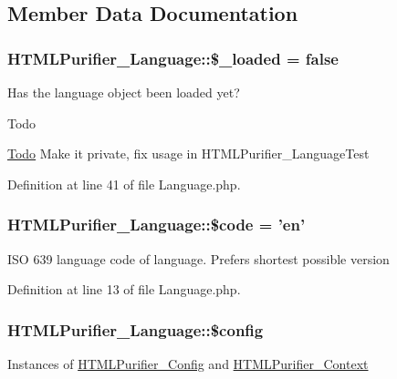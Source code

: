 \subsection{Member Data Documentation}
\hypertarget{classHTMLPurifier__Language_a972e2795bb72936c59aa28d6b893e7e9}{
\subsubsection[{\$\+\_\+loaded}]{\setlength{\rightskip}{0pt plus 5cm}H\+T\+M\+L\+Purifier\+\_\+\+Language\+::\$\+\_\+loaded = false}}\label{classHTMLPurifier__Language_a972e2795bb72936c59aa28d6b893e7e9}
Has the language object been loaded yet? \begin{DoxyRefDesc}{Todo}
\item[\hyperlink{todo__todo000024}{Todo}]Make it private, fix usage in H\+T\+M\+L\+Purifier\+\_\+\+Language\+Test \end{DoxyRefDesc}


Definition at line 41 of file Language.\+php.

\hypertarget{classHTMLPurifier__Language_a5d7bd0b73124250f04e8d6848f16c3ff}{
\subsubsection[{\$code}]{\setlength{\rightskip}{0pt plus 5cm}H\+T\+M\+L\+Purifier\+\_\+\+Language\+::\$code = 'en'}}\label{classHTMLPurifier__Language_a5d7bd0b73124250f04e8d6848f16c3ff}
I\+S\+O 639 language code of language. Prefers shortest possible version 

Definition at line 13 of file Language.\+php.

\hypertarget{classHTMLPurifier__Language_a3bbdf4305e5d242a46270e8c8fd912c8}{
\subsubsection[{\$config}]{\setlength{\rightskip}{0pt plus 5cm}H\+T\+M\+L\+Purifier\+\_\+\+Language\+::\$config\hspace{0.3cm}{\ttfamily [protected]}}}\label{classHTMLPurifier__Language_a3bbdf4305e5d242a46270e8c8fd912c8}
Instances of \hyperlink{classHTMLPurifier__Config}{H\+T\+M\+L\+Purifier\+\_\+\+Config} and \hyperlink{classHTMLPurifier__Context}{H\+T\+M\+L\+Purifier\+\_\+\+Context} 

